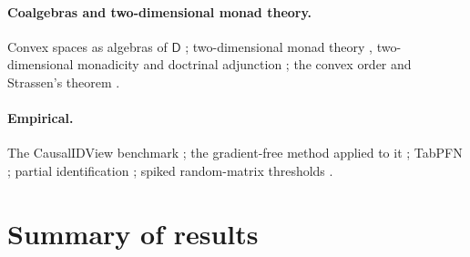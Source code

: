 \documentclass[11pt]{article}
\theoremstyle{definition}
\theoremstyle{remark}
\newcommand{\D}{\mathsf{D}}
\begin{document}
\paragraph{Coalgebras and two-dimensional monad theory.} Convex spaces as algebras of $\D$
\cite{Fritz2009}; two-dimensional monad theory \cite{BKP1989,Lack2002}, two-dimensional monadicity
\cite{Bourke2014} and doctrinal adjunction \cite{Kelly1974}; the convex order and Strassen's theorem
\cite{Strassen1965}.
\paragraph{Empirical.} The CausalIDView benchmark \cite{Jung2026}; the gradient-free method applied
to it \cite[Section~51]{Awasthi-ThreeLayers}; TabPFN \cite{Hollmann2023}; partial
identification \cite{Manski1990}; spiked random-matrix thresholds \cite{BBP2005}.

\section{Summary of results}
\end{document}
